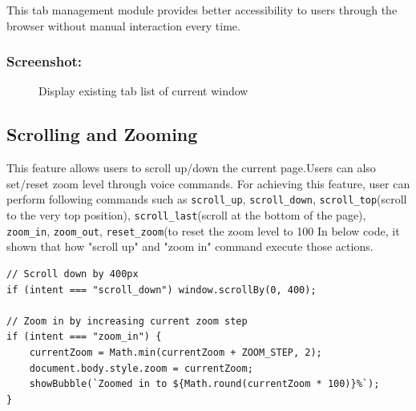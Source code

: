 This tab management module provides better accessibility to users  through the browser without manual interaction every time.

\subsubsection*{Screenshot:}
\begin{figure}[htbp] 
    \centering
    \caption{ Display existing tab list of current window}
    \label{fig:display_tabs}
\end{figure}

\subsection{Scrolling and Zooming}
This feature allows users to scroll up/down the current page.Users can also set/reset zoom level through voice commands. For achieving this feature, user can perform following commands such as \texttt{scroll\_up}, \texttt{scroll\_down}, \texttt{scroll\_top}(scroll to the very top position), \texttt{scroll\_last}(scroll at the bottom of the page), \texttt{zoom\_in}, \texttt{zoom\_out}, \texttt{reset\_zoom}(to reset the zoom level to 100%
In below code, it shown that how "scroll up" and "zoom in" command execute those actions.

\begin{verbatim}
// Scroll down by 400px
if (intent === "scroll_down") window.scrollBy(0, 400);

// Zoom in by increasing current zoom step
if (intent === "zoom_in") {
    currentZoom = Math.min(currentZoom + ZOOM_STEP, 2);
    document.body.style.zoom = currentZoom;
    showBubble(`Zoomed in to ${Math.round(currentZoom * 100)}%`);
}
\end{verbatim}

